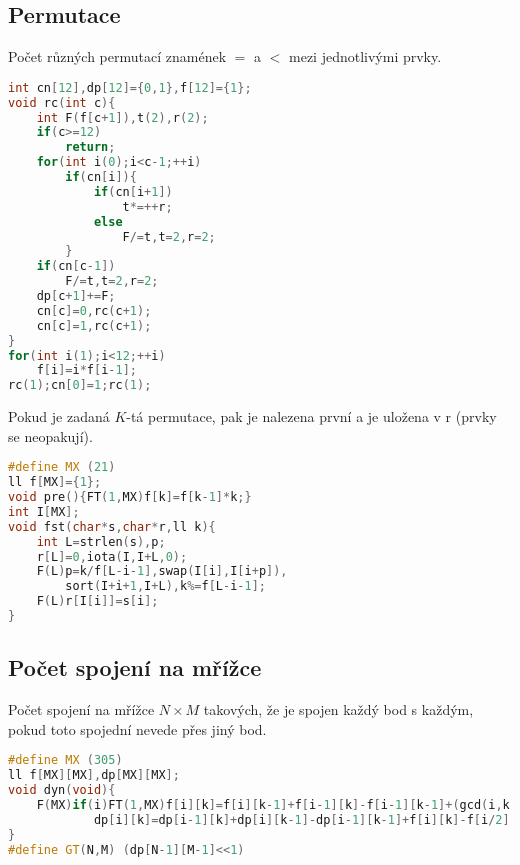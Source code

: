 \documentclass[11pt]{article}
\begin{document}
\subsection{Permutace}
Počet různých permutací znamének $=$ a $<$ mezi jednotlivými prvky.
\begin{lstlisting}[language=C++]
int cn[12],dp[12]={0,1},f[12]={1};
void rc(int c){
    int F(f[c+1]),t(2),r(2);
    if(c>=12)
        return;
    for(int i(0);i<c-1;++i)
        if(cn[i]){
            if(cn[i+1])
                t*=++r;
            else
                F/=t,t=2,r=2;
        }
    if(cn[c-1])
        F/=t,t=2,r=2;
    dp[c+1]+=F;
    cn[c]=0,rc(c+1);
    cn[c]=1,rc(c+1);
}
for(int i(1);i<12;++i)
    f[i]=i*f[i-1];
rc(1);cn[0]=1;rc(1);
\end{lstlisting}
Pokud je zadaná $K$-tá permutace, pak je nalezena první a je uložena v \textsf{r} (prvky se neopakují).
\begin{lstlisting}[language=C++]
#define MX (21)
ll f[MX]={1};
void pre(){FT(1,MX)f[k]=f[k-1]*k;}
int I[MX];
void fst(char*s,char*r,ll k){
    int L=strlen(s),p;
    r[L]=0,iota(I,I+L,0);
    F(L)p=k/f[L-i-1],swap(I[i],I[i+p]),
        sort(I+i+1,I+L),k%=f[L-i-1];
    F(L)r[I[i]]=s[i];
}
\end{lstlisting}
\subsection{Počet spojení na mřížce}
Počet spojení na mřížce $N\times M$ takových, že je spojen každý bod s každým, pokud toto spojední nevede přes jiný bod.
\begin{lstlisting}[language=C++]
#define MX (305)
ll f[MX][MX],dp[MX][MX];
void dyn(void){
    F(MX)if(i)FT(1,MX)f[i][k]=f[i][k-1]+f[i-1][k]-f[i-1][k-1]+(gcd(i,k)==1),
            dp[i][k]=dp[i-1][k]+dp[i][k-1]-dp[i-1][k-1]+f[i][k]-f[i/2][k/2];
}
#define GT(N,M) (dp[N-1][M-1]<<1)
\end{lstlisting}
\end{document}
